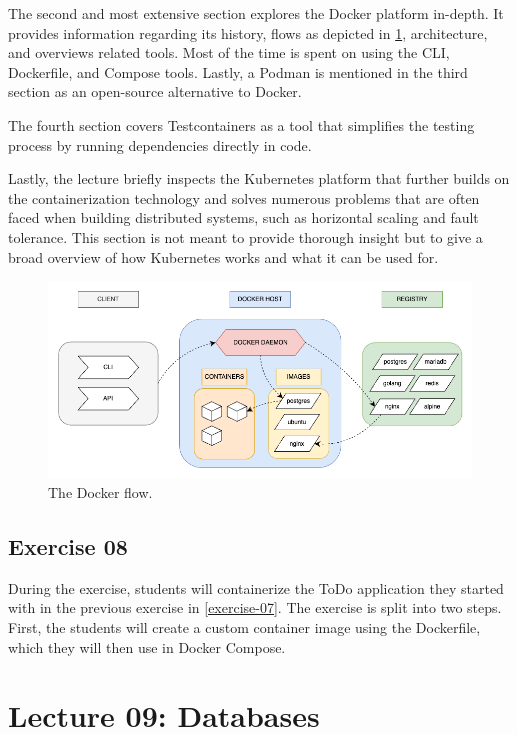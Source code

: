 \documentclass[
  digital,
  color,
  oneside,
  nosansbold,
  nocolorbold,
  nolof,
  nolot,
]{fithesis4}
\begin{document}
The second and most extensive section explores the Docker\cite{docker} platform in-depth. It provides information regarding its history, flows as depicted in \cref{fig:docker}, architecture, and overviews related tools. Most of the time is spent on using the CLI, Dockerfile, and Compose tools. Lastly, a Podman\cite{podman} is mentioned in the third section as an open-source alternative to Docker.

The fourth section covers Testcontainers\cite{testcontainers} as a tool that simplifies the testing process by running dependencies directly in code.

Lastly, the lecture briefly inspects the Kubernetes\cite{kubernetes} platform that further builds on the containerization technology and solves numerous problems that are often faced when building distributed systems, such as horizontal scaling and fault tolerance. This section is not meant to provide thorough insight but to give a broad overview of how Kubernetes works and what it can be used for.

\begin{figure}[H]
    \centering
    \includegraphics[width=12cm]{figures/docker.png}
    \caption{The Docker flow.}
    \label{fig:docker}
\end{figure}

\subsection{Exercise 08}\label{exercise-08}

During the exercise, students will containerize the ToDo application they started with in the previous exercise in \cref{exercise-07}. The exercise is split into two steps. First, the students will create a custom container image using the Dockerfile, which they will then use in Docker Compose.

\section{Lecture 09: Databases}\label{lecture-databases}
\end{document}
